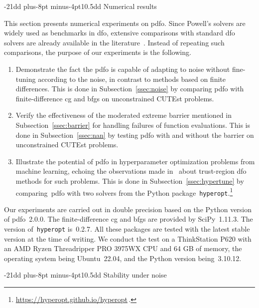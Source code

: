 \documentclass[
    smallextended,  %
    final,          %
]{svjour3}
\makeatletter
\def\section{\@startsection{section}{1}{\z@}%
    {-21dd plus-8pt minus-4pt}{10.5dd}
    {\sffamily\normalsize\bfseries\boldmath}}
\def\subsection{\@startsection{subsection}{2}{\z@}%
    {-21dd plus-8pt minus-4pt}{10.5dd}
    {\sffamily\normalsize\bfseries}}
\newcommand{\modified}[1]{\texorpdfstring{{\color{RoyalBlue}#1}}{#1}}
\makeatother
\begin{document}
\section{Numerical results}
\label{sec:numerical}

This section presents numerical experiments on \gls{pdfo}.
Since Powell's solvers are widely used as benchmarks in \gls{dfo}, extensive comparisons with standard \gls{dfo} solvers are already available in the literature~\cite{More_Wild_2009,Rios_Sahinidis_2013}.
Instead of repeating such comparisons, the purpose of our experiments is the following.
\begin{enumerate}
    \item Demonstrate the fact the \gls{pdfo} is capable of adapting to noise without fine-tuning according to the noise, in contrast to methods based on finite differences.
        This is done in Subsection~\ref{ssec:noise} by comparing \gls{pdfo} with finite-difference \gls{cg} and \gls{bfgs} on unconstrained CUTEst problems.
    \item Verify the effectiveness of the moderated extreme barrier mentioned in Subsection~\ref{ssec:barrier} for handling failures of function evaluations.
        This is done in Subsection~\ref{ssec:nan} by testing \gls{pdfo} with and without the barrier on unconstrained CUTEst problems.
    \item Illustrate the potential of \gls{pdfo} in hyperparameter optimization problems from machine learning, echoing the observations made in~\cite{Ghanbari_Scheinberg_2017} about trust-region \gls{dfo} methods for such problems.
        This is done in Subsection~\ref{ssec:hypertune} by comparing~\gls{pdfo} with two solvers from the Python package~\texttt{hyperopt}.\footnote{\url{https://hyperopt.github.io/hyperopt}\,.}
\end{enumerate}

Our experiments are carried out in double precision based on the Python version of \gls{pdfo}~\modified{2.0.0}.
The finite-difference \gls{cg} and \gls{bfgs} are provided by SciPy~\modified{1.11.3}.
The version of~\texttt{hyperopt} is~0.2.7.
All these packages are tested with the latest stable version at the time of writing.
We conduct the test on a ThinkStation P620 with an AMD Ryzen Threadripper PRO 3975WX CPU and 64 GB of memory, the operating system being Ubuntu~22.04, and the Python version being~\modified{3.10.12}.

\subsection{Stability under noise}
\label{ssec:noise}
\end{document}
